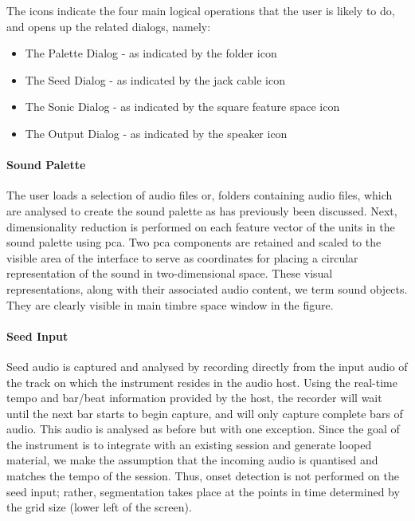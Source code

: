 The icons indicate the four main logical operations that the user is likely to do, and opens up the related dialogs, namely:
\begin{itemize}
  \item The Palette Dialog - as indicated by the folder icon
  \item The Seed Dialog - as indicated by the jack cable icon
  \item The Sonic Dialog - as indicated by the square feature space icon
  \item The Output Dialog - as indicated by the speaker icon
\end{itemize}

\paragraph{Sound Palette}

The user loads a selection of audio files or, folders containing audio files, which are analysed to create the sound palette as has previously been discussed. Next, dimensionality reduction is performed on each feature vector of the units in the sound palette using \acrfull{pca}. Two \acrshort{pca} components are retained and scaled to the visible area of the interface to serve as coordinates for placing a circular representation of the sound in two-dimensional space. These visual representations, along with their associated audio content, we term sound objects. They are clearly visible in main timbre space window in the figure.

\paragraph{Seed Input}

Seed audio is captured and analysed by recording directly from the input audio of the track on which the instrument resides in the audio host. Using the real-time tempo and bar/beat information provided by the host, the recorder will wait until the next bar starts to begin capture, and will only capture complete bars of audio. This audio is analysed as before but with one exception. Since the goal of the instrument is to integrate with an existing session and generate looped material, we make the assumption that the incoming audio is quantised and matches the tempo of the session. Thus, onset detection is not performed on the seed input; rather, segmentation takes place at the points in time determined by the grid size (lower left of the screen).

